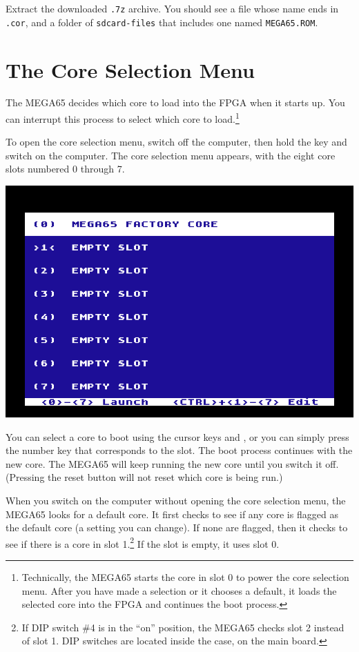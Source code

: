 Extract the downloaded {\tt .7z} archive. You should see a file whose name ends in {\tt .cor}, and a folder of {\tt sdcard-files} that includes one named {\tt MEGA65.ROM}.

\section{The Core Selection Menu}

The MEGA65 decides which core to load into the FPGA when it starts up. You can interrupt this process to select which core to load.\footnote{Technically, the MEGA65 starts the core in slot 0 to power the core selection menu. After you have made a selection or it chooses a default, it loads the selected core into the FPGA and continues the boot process.}

To open the core selection menu, switch off the computer, then hold the  key and switch on the computer. The core selection menu appears, with the eight core slots numbered 0 through 7.

\begin{center}
  \includegraphics[width=0.7\linewidth]{images/ss-flashmenu.png}
\end{center}

You can select a core to boot using the cursor keys and , or you can simply press the number key that corresponds to the slot. The boot process continues with the new core. The MEGA65 will keep running the new core until you switch it off. (Pressing the reset button will not reset which core is being run.)

When you switch on the computer without opening the core selection menu, the MEGA65 looks for a default core. It first checks to see if any core is flagged as the default core (a setting you can change). If none are flagged, then it checks to see if there is a core in slot 1.\footnote{If DIP switch \#4 is in the ``on'' position, the MEGA65 checks slot 2 instead of slot 1. DIP switches are located inside the case, on the main board.} If the slot is empty, it uses slot 0.

